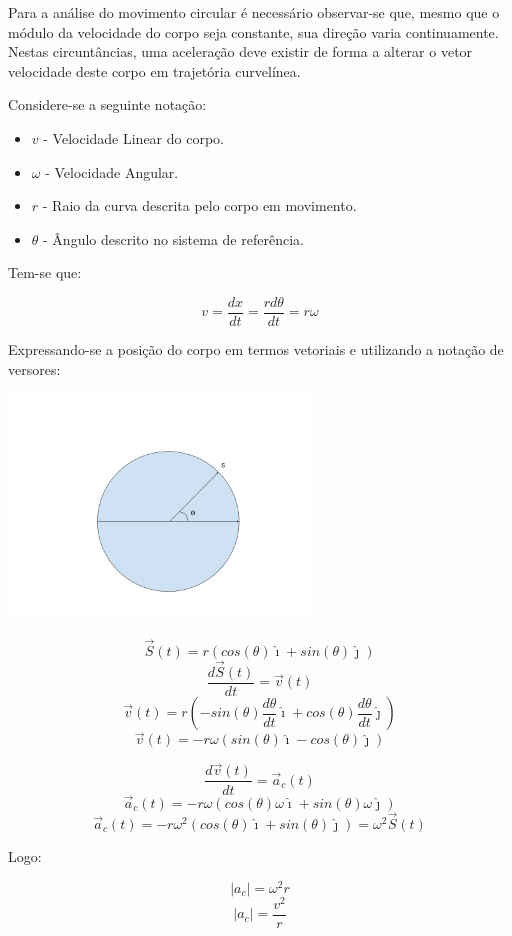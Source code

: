 \documentclass[
    12pt, %
    openright,
    twoside, %
    a4paper, %
    article,
    english,brazil %
]{abntex2}
\begin{document}
Para a análise do movimento circular é necessário observar-se que, mesmo que o módulo da velocidade do corpo seja constante, sua direção varia continuamente. Nestas circuntâncias, uma aceleração deve existir de forma a alterar o vetor velocidade deste corpo em trajetória curvelínea. 

Considere-se a seguinte notação:

\begin{itemize}
    \item $v$ - Velocidade Linear do corpo. 
    \item $\omega$ - Velocidade Angular. 
    \item $r$ - Raio da curva descrita pelo corpo em movimento. 
    \item $\theta$ - Ângulo descrito no sistema de referência.
\end{itemize}

Tem-se que:

$$ v = \frac{dx}{dt} = \frac{rd\theta}{dt} = r\omega$$

Expressando-se a posição do corpo em termos vetoriais e utilizando a notação de versores:

\includegraphics[width=\linewidth,height=6cm,keepaspectratio,]{./fig/Circulo.png}

$$\vec S(t) = r(cos(\theta)\hat \imath + sin(\theta)\hat \jmath)$$
$$\frac{d\vec S(t)}{dt} = \vec v(t)$$
$$\vec v(t) = r(-sin(\theta)\frac{d\theta}{dt}\hat \imath + cos(\theta)\frac{d\theta}{dt}\hat \jmath)$$
$$\vec v(t) = -r\omega(sin(\theta)\hat \imath - cos(\theta)\hat \jmath)$$

$$\frac{d\vec v(t)}{dt} = \vec a_c(t)$$
$$\vec a_c(t) = -r\omega(cos(\theta)\omega\hat \imath + sin(\theta)\omega\hat \jmath)$$
$$\vec a_c(t) = -r\omega^2(cos(\theta)\hat \imath + sin(\theta)\hat \jmath) = \omega^2\vec S(t)$$

Logo:

$$|a_c| = \omega^2r$$
$$|a_c| = \frac{v^2}{r}$$
\end{document}
